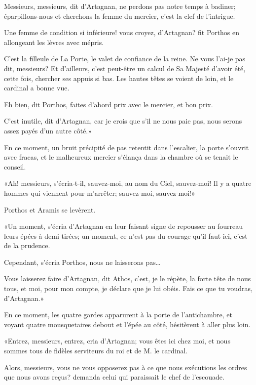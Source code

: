 \speak  Messieurs, messieurs, dit d'Artagnan, ne perdons pas notre temps à badiner; éparpillons-nous et cherchons la femme du mercier, c'est la clef de l'intrigue. 

\speak  Une femme de condition si inférieure! vous croyez, d'Artagnan? fit Porthos en allongeant les lèvres avec mépris. 

\speak  C'est la filleule de La Porte, le valet de confiance de la reine. Ne vous l'ai-je pas dit, messieurs? Et d'ailleurs, c'est peut-être un calcul de Sa Majesté d'avoir été, cette fois, chercher ses appuis si bas. Les hautes têtes se voient de loin, et le cardinal a bonne vue. 

\speak  Eh bien, dit Porthos, faites d'abord prix avec le mercier, et bon prix. 

\speak  C'est inutile, dit d'Artagnan, car je crois que s'il ne nous paie pas, nous serons assez payés d'un autre côté.» 

En ce moment, un bruit précipité de pas retentit dans l'escalier, la porte s'ouvrit avec fracas, et le malheureux mercier s'élança dans la chambre où se tenait le conseil. 

«Ah! messieurs, s'écria-t-il, sauvez-moi, au nom du Ciel, sauvez-moi! Il y a quatre hommes qui viennent pour m'arrêter; sauvez-moi, sauvez-moi!» 

Porthos et Aramis se levèrent. 

«Un moment, s'écria d'Artagnan en leur faisant signe de repousser au fourreau leurs épées à demi tirées; un moment, ce n'est pas du courage qu'il faut ici, c'est de la prudence. 

\speak  Cependant, s'écria Porthos, nous ne laisserons pas\dots 

\speak  Vous laisserez faire d'Artagnan, dit Athos, c'est, je le répète, la forte tête de nous tous, et moi, pour mon compte, je déclare que je lui obéis. Fais ce que tu voudras, d'Artagnan.» 

En ce moment, les quatre gardes apparurent à la porte de l'antichambre, et voyant quatre mousquetaires debout et l'épée au côté, hésitèrent à aller plus loin. 

«Entrez, messieurs, entrez, cria d'Artagnan; vous êtes ici chez moi, et nous sommes tous de fidèles serviteurs du roi et de M. le cardinal. 

\speak  Alors, messieurs, vous ne vous opposerez pas à ce que nous exécutions les ordres que nous avons reçus? demanda celui qui paraissait le chef de l'escouade. 

